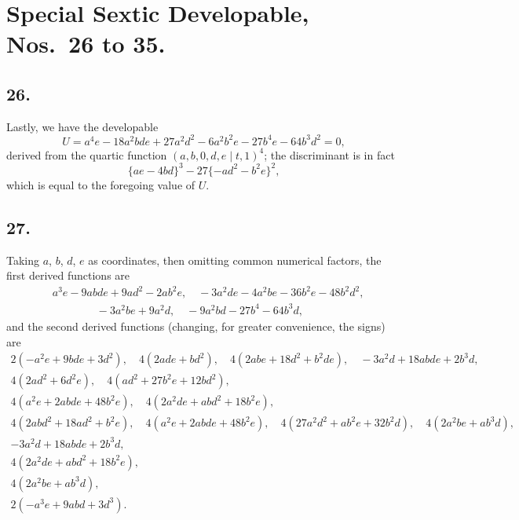\documentclass[11pt,a4paper]{article}
\theoremstyle{definition}
\begin{document}
\newpage
\section*{Special Sextic Developable, Nos.\ 26 to 35.}

\subsection*{26.}

Lastly, we have the developable
\[
U = a^{4}e - 18a^{2}bde + 27a^{2}d^{2} - 6a^{2}b^{2}e - 27b^{4}e - 64b^{3}d^{2} = 0,
\]
derived from the quartic function $(a, b, 0, d, e \mid t, 1)^{4}$; the discriminant is in fact
\[
\{ae - 4bd\}^{3} - 27\{-ad^{2} - b^{2}e\}^{2},
\]
which is equal to the foregoing value of $U$.

\subsection*{27.}

Taking $a$, $b$, $d$, $e$ as coordinates, then omitting common numerical factors, the
first derived functions are
\begin{align*}
&a^{3}e - 9abde + 9ad^{2} - 2ab^{2}e,\quad -3a^{2}de - 4a^{2}be - 36b^{2}e - 48b^{2}d^{2},\\
&\qquad\qquad -3a^{2}be + 9a^{2}d,\quad -9a^{2}bd - 27b^{4} - 64b^{3}d,
\end{align*}
and the second derived functions (changing, for greater convenience, the signs) are
\begin{gather*}
2(-a^{2}e + 9bde + 3d^{2}),\quad 4(2ade + bd^{2}),\quad 4(2abe + 18d^{2} + b^{2}de),\quad -3a^{2}d + 18abde + 2b^{3}d,\\
4(2ad^{2} + 6d^{2}e),\quad 4(ad^{2} + 27b^{2}e + 12bd^{2}),\\
4(a^{2}e + 2abde + 48b^{2}e),\quad 4(2a^{2}de + abd^{2} + 18b^{2}e),\\
4(2abd^{2} + 18ad^{2} + b^{2}e),\quad 4(a^{2}e + 2abde + 48b^{2}e),\quad 4(27a^{2}d^{2} + ab^{2}e + 32b^{2}d),\quad 4(2a^{2}be + ab^{3}d),\\
-3a^{2}d + 18abde + 2b^{3}d,\\
4(2a^{2}de + abd^{2} + 18b^{2}e),\\
4(2a^{2}be + ab^{3}d),\\
2(-a^{3}e + 9abd + 3d^{3}).
\end{gather*}
\end{document}
